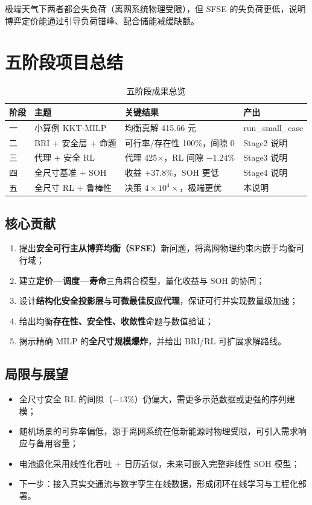 \documentclass[UTF8,a4paper,11pt]{ctexart}
\begin{document}
极端天气下两者都会失负荷（离网系统物理受限），但 SFSE 的失负荷更低，说明博弈定价能通过引导负荷错峰、配合储能减缓缺额。

\section{五阶段项目总结}

\begin{table}[htbp]
\centering
\small
\caption{五阶段成果总览}
\begin{tabular}{p{1.2cm} p{4.4cm} p{5.0cm} p{3.0cm}}
\toprule
\textbf{阶段} & \textbf{主题} & \textbf{关键结果} & \textbf{产出}\\
\midrule
一 & 小算例 KKT-MILP & 均衡真解 415.66 元 & run\_small\_case\\
二 & BRI + 安全层 + 命题 & 可行率/存在性 100\%，间隙 0 & Stage2 说明\\
三 & 代理 + 安全 RL & 代理 425$\times$，RL 间隙 $-1.24\%$ & Stage3 说明\\
四 & 全尺寸基准 + SOH & 收益 $+37.8\%$，SOH 更低 & Stage4 说明\\
五 & 全尺寸 RL + 鲁棒性 & 决策 $4\times10^4\times$，极端更优 & 本说明\\
\bottomrule
\end{tabular}
\end{table}

\subsection{核心贡献}
\begin{enumerate}
  \item 提出\textbf{安全可行主从博弈均衡（SFSE）}新问题，将离网物理约束内嵌于均衡可行域；
  \item 建立\textbf{定价—调度—寿命}三角耦合模型，量化收益与 SOH 的协同；
  \item 设计\textbf{结构化安全投影层}与\textbf{可微最佳反应代理}，保证可行并实现数量级加速；
  \item 给出均衡\textbf{存在性、安全性、收敛性}命题与数值验证；
  \item 揭示精确 MILP 的\textbf{全尺寸规模爆炸}，并给出 BRI/RL 可扩展求解路线。
\end{enumerate}

\subsection{局限与展望}
\begin{itemize}
  \item 全尺寸安全 RL 的间隙（$-13\%$）仍偏大，需更多示范数据或更强的序列建模；
  \item 随机场景的可靠率偏低，源于离网系统在低新能源时物理受限，可引入需求响应与备用容量；
  \item 电池退化采用线性化吞吐 + 日历近似，未来可嵌入完整非线性 SOH 模型；
  \item 下一步：接入真实交通流与数字孪生在线数据，形成闭环在线学习与工程化部署。
\end{itemize}
\end{document}
